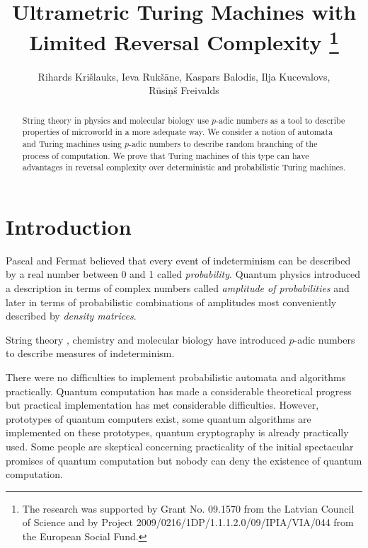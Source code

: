 \documentclass{llncs}
\begin{document}
\title{Ultrametric Turing Machines with Limited Reversal Complexity
\thanks{%
The research was supported by Grant No. 09.1570 from the
Latvian Council of Science and by Project 2009/0216/1DP/1.1.1.2.0/09/IPIA/VIA/044
from the 
European Social Fund.
} 
}

\author{
Rihards Kri\v slauks,
Ieva Ruk\v s\= ane,
Kaspars Balodis,
Ilja Kucevalovs,\\
R\= usi\c n\v s Freivalds}

\maketitle

\begin{abstract}  
String theory in physics and molecular biology use $p$-adic numbers as a tool to
describe properties of microworld in a more adequate way. We consider a notion of
automata and Turing machines using $p$-adic numbers to describe random branching of 
the process of computation. 
We prove that Turing machines of this type can have advantages in reversal complexity over
deterministic and probabilistic Turing machines. 
\end{abstract} 



\section{Introduction} 

Pascal and Fermat believed that every event of indeterminism can be described by a real number between 0 and 1 called 
{\em probability}. Quantum physics introduced a description in terms of complex numbers called {\em amplitude of 
probabilities} and later in terms of probabilistic combinations of amplitudes most conveniently described by {\em density
matrices}.

String theory \cite{VVZ95}, chemistry \cite{K06} and molecular biology \cite{DD09,Kh97} have introduced $p$-adic numbers to describe
measures of indeterminism. 

There were no difficulties to implement probabilistic automata and algorithms practically. Quantum computation \cite{H01}  has made a considerable
theoretical progress but practical implementation has met considerable difficulties. However, prototypes of quantum computers exist, some
quantum algorithms are implemented on these prototypes, quantum cryptography is already practically used. Some people are skeptical concerning
practicality of the initial spectacular promises of quantum computation but nobody can deny the existence of quantum computation.
\end{document}
